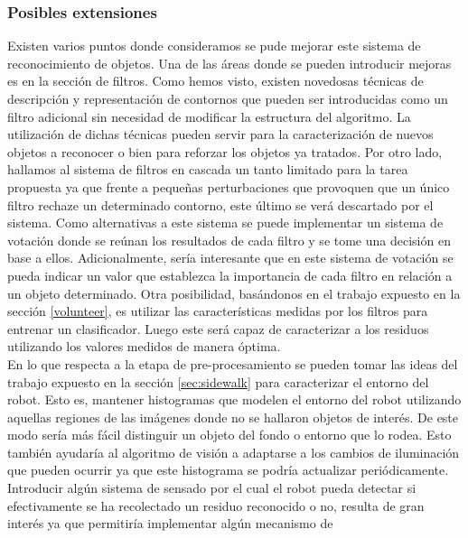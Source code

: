 \subsubsection{Posibles extensiones}
Existen varios puntos donde consideramos se pude mejorar este sistema 
de reconocimiento de objetos. Una de las \'areas donde se pueden introducir mejoras es en 
la secci\'on de filtros. Como hemos visto, existen novedosas t\'ecnicas de 
descripci\'on y representaci\'on de contornos que pueden ser introducidas 
como un filtro adicional sin necesidad de modificar la estructura del 
algoritmo. La utilizaci\'on de dichas t\'ecnicas pueden servir para 
la caracterizaci\'on de nuevos objetos a reconocer o bien para reforzar 
los objetos ya tratados. Por otro lado, hallamos al sistema de filtros 
en cascada un tanto limitado para la tarea propuesta ya que frente a 
peque\~nas perturbaciones que provoquen que un \'unico filtro rechaze un 
determinado contorno, este \'ultimo se ver\'a descartado por el sistema. 
Como alternativas a este sistema se puede implementar un sistema de 
votaci\'on donde se re\'unan los resultados de cada filtro y se tome una 
decisi\'on en base a ellos. Adicionalmente, ser\'ia interesante que en 
este sistema de votaci\'on se pueda indicar un valor que establezca la 
importancia de cada filtro en relaci\'on a un objeto determinado. Otra 
posibilidad, bas\'andonos en el trabajo \cite{potato} expuesto en la 
secci\'on \ref{volunteer}, es utilizar las 
caracter\'isticas medidas por los filtros para entrenar un clasificador. 
Luego este ser\'a capaz de caracterizar a los residuos utilizando los 
valores medidos de manera \'optima.\\
\indent En lo que respecta a la etapa de pre-procesamiento se pueden 
tomar las ideas del trabajo \cite{sidewalk2008} expuesto en la secci\'on \ref{sec:sidewalk} 
para caracterizar el entorno del robot. Esto es, mantener histogramas 
que modelen el entorno del robot utilizando aquellas regiones de las 
im\'agenes donde no se hallaron  objetos de inter\'es. De este modo ser\'ia m\'as f\'acil 
distinguir un objeto del fondo o entorno que lo rodea. Esto tambi\'en 
ayudar\'ia al algoritmo de visi\'on a adaptarse a los cambios de 
iluminaci\'on que pueden ocurrir ya que este histograma se podr\'ia 
actualizar peri\'odicamente.\\
\indent Introducir alg\'un sistema de sensado por el cual el robot pueda 
detectar si efectivamente se ha recolectado un residuo reconocido o no, resulta de 
gran inter\'es ya que permitir\'ia implementar alg\'un mecanismo de 
